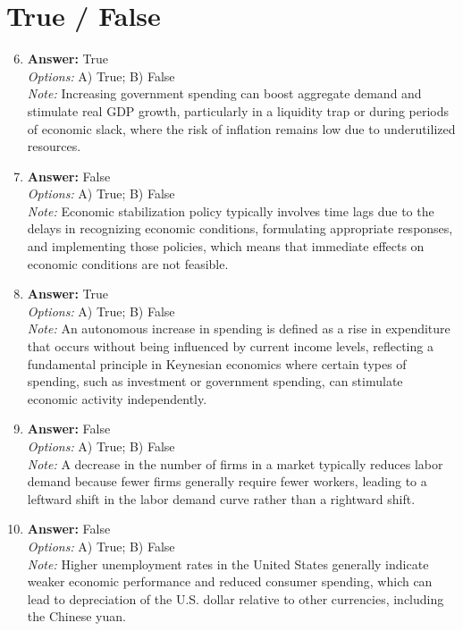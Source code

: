 \documentclass[12pt]{article}
\begin{document}
\section*{True / False}
\begin{enumerate}[label=\arabic*.]
\setcounter{enumi}{5}
\item \textbf{Answer:} True
\\ \textit{Options:} A) True; B) False
\\ \textit{Note:} Increasing government spending can boost aggregate demand and stimulate real GDP growth, particularly in a liquidity trap or during periods of economic slack, where the risk of inflation remains low due to underutilized resources.
\item \textbf{Answer:} False
\\ \textit{Options:} A) True; B) False
\\ \textit{Note:} Economic stabilization policy typically involves time lags due to the delays in recognizing economic conditions, formulating appropriate responses, and implementing those policies, which means that immediate effects on economic conditions are not feasible.
\item \textbf{Answer:} True
\\ \textit{Options:} A) True; B) False
\\ \textit{Note:} An autonomous increase in spending is defined as a rise in expenditure that occurs without being influenced by current income levels, reflecting a fundamental principle in Keynesian economics where certain types of spending, such as investment or government spending, can stimulate economic activity independently.
\item \textbf{Answer:} False
\\ \textit{Options:} A) True; B) False
\\ \textit{Note:} A decrease in the number of firms in a market typically reduces labor demand because fewer firms generally require fewer workers, leading to a leftward shift in the labor demand curve rather than a rightward shift.
\item \textbf{Answer:} False
\\ \textit{Options:} A) True; B) False
\\ \textit{Note:} Higher unemployment rates in the United States generally indicate weaker economic performance and reduced consumer spending, which can lead to depreciation of the U.S. dollar relative to other currencies, including the Chinese yuan.
\end{enumerate}
\end{document}
